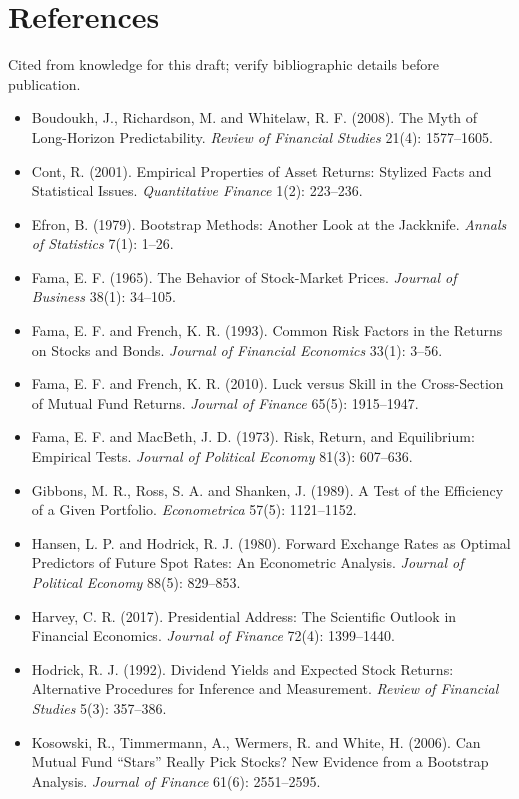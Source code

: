 \section*{References}

Cited from knowledge for this draft; verify bibliographic details before publication.

\begin{itemize}
  \item Boudoukh, J., Richardson, M. and Whitelaw, R. F. (2008). The Myth of Long-Horizon Predictability. \emph{Review of Financial Studies} 21(4): 1577--1605.
  \item Cont, R. (2001). Empirical Properties of Asset Returns: Stylized Facts and Statistical Issues. \emph{Quantitative Finance} 1(2): 223--236.
  \item Efron, B. (1979). Bootstrap Methods: Another Look at the Jackknife. \emph{Annals of Statistics} 7(1): 1--26.
  \item Fama, E. F. (1965). The Behavior of Stock-Market Prices. \emph{Journal of Business} 38(1): 34--105.
  \item Fama, E. F. and French, K. R. (1993). Common Risk Factors in the Returns on Stocks and Bonds. \emph{Journal of Financial Economics} 33(1): 3--56.
  \item Fama, E. F. and French, K. R. (2010). Luck versus Skill in the Cross-Section of Mutual Fund Returns. \emph{Journal of Finance} 65(5): 1915--1947.
  \item Fama, E. F. and MacBeth, J. D. (1973). Risk, Return, and Equilibrium: Empirical Tests. \emph{Journal of Political Economy} 81(3): 607--636.
  \item Gibbons, M. R., Ross, S. A. and Shanken, J. (1989). A Test of the Efficiency of a Given Portfolio. \emph{Econometrica} 57(5): 1121--1152.
  \item Hansen, L. P. and Hodrick, R. J. (1980). Forward Exchange Rates as Optimal Predictors of Future Spot Rates: An Econometric Analysis. \emph{Journal of Political Economy} 88(5): 829--853.
  \item Harvey, C. R. (2017). Presidential Address: The Scientific Outlook in Financial Economics. \emph{Journal of Finance} 72(4): 1399--1440.
  \item Hodrick, R. J. (1992). Dividend Yields and Expected Stock Returns: Alternative Procedures for Inference and Measurement. \emph{Review of Financial Studies} 5(3): 357--386.
  \item Kosowski, R., Timmermann, A., Wermers, R. and White, H. (2006). Can Mutual Fund ``Stars'' Really Pick Stocks? New Evidence from a Bootstrap Analysis. \emph{Journal of Finance} 61(6): 2551--2595.

\end{itemize}
